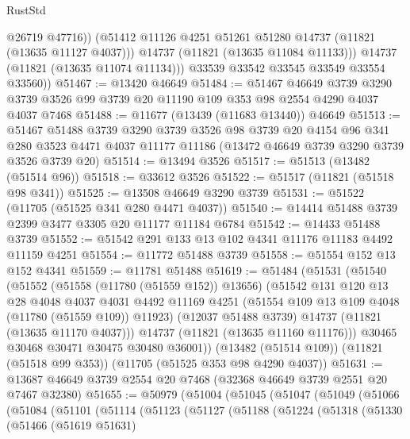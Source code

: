 \begin{lexlean}{RustStd}
\begin{coremodule}
                @26719
                @47716))
            (@51412 @11126 @4251 @51261 @51280 @14737 (@11821 (@13635 @11127 @4037)))
            @14737
            (@11821 (@13635 @11084 @11133)))
          @14737
          (@11821 (@13635 @11074 @11134)))
        @33539
        @33542
        @33545
        @33549
        @33554
        @33560))
@51467 := @13420 @46649
@51484 := @51467
    @46649
    @3739
    @3290
    @3739
    @3526
    @99
    @3739
    @20
    @11190
    @109
    @353
    @98
    @2554
    @4290
    @4037
    @4037
    @7468
@51488 := @11677 (@13439 (@11683 @13440)) @46649
@51513 := @51467
    @51488
    @3739
    @3290
    @3739
    @3526
    @98
    @3739
    @20
    @4154
    @96
    @341
    @280
    @3523
    @4471
    @4037
    @11177
    @11186
    (@13472 @46649 @3739 @3290 @3739 @3526 @3739 @20)
@51514 := @13494 @3526
@51517 := @51513 (@13482 (@51514 @96))
@51518 := @33612 @3526
@51522 := @51517 (@11821 (@51518 @98 @341))
@51525 := @13508 @46649 @3290 @3739
@51531 := @51522 (@11705 (@51525 @341 @280 @4471 @4037))
@51540 := @14414 @51488 @3739 @2399 @3477 @3305 @20 @11177 @11184 @6784
@51542 := @14433 @51488 @3739
@51552 := @51542 @291 @133 @13 @102 @4341 @11176 @11183 @4492 @11159 @4251
@51554 := @11772 @51488 @3739
@51558 := @51554 @152 @13 @152 @4341
@51559 := @11781 @51488
@51619 := @51484
    (@51531
      (@51540
        (@51552
          (@51558 (@11780 (@51559 @152)) @13656)
          (@51542
            @131
            @120
            @13
            @28
            @4048
            @4037
            @4031
            @4492
            @11169
            @4251
            (@51554 @109 @13 @109 @4048 (@11780 (@51559 @109)) @11923)
            (@12037 @51488 @3739)
            @14737
            (@11821 (@13635 @11170 @4037)))
          @14737
          (@11821 (@13635 @11160 @11176)))
        @30465
        @30468
        @30471
        @30475
        @30480
        @36001))
    (@13482 (@51514 @109))
    (@11821 (@51518 @99 @353))
    (@11705 (@51525 @353 @98 @4290 @4037))
@51631 := @13687 @46649 @3739 @2554 @20 @7468 (@32368 @46649 @3739 @2551 @20 @7467 @32380)
@51655 := @50979
    (@51004
      (@51045
        (@51047
          (@51049
            (@51066
              (@51084
                (@51101
                  (@51114
                    (@51123
                      (@51127
                        (@51188
                          (@51224
                            (@51318
                              (@51330
                                (@51466
                                  (@51619 @51631)

\end{coremodule}
\end{lexlean}
